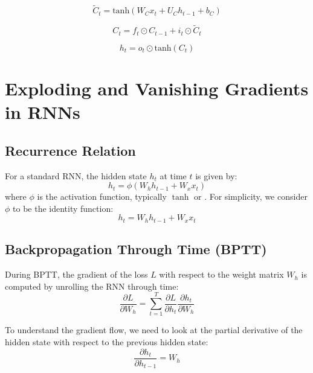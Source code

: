 \documentclass{article}
\begin{document}
\begin{equation}
\tilde{C}_t = \text{tanh}(W_C x_t + U_C h_{t-1} + b_C)
\end{equation}

\begin{equation}
C_t = f_t \odot C_{t-1} + i_t \odot \tilde{C}_t
\end{equation}

\begin{equation}
h_t = o_t \odot \text{tanh}(C_t)
\end{equation}

\section*{Exploding and Vanishing Gradients in RNNs}

\subsection*{Recurrence Relation}

For a standard RNN, the hidden state \( h_t \) at time \( t \) is given by:
\begin{equation}
h_t = \phi(W_h h_{t-1} + W_x x_t)
\end{equation}
where \( \phi \) is the activation function, typically \( \tanh \) or . For simplicity, we consider \( \phi \) to be the identity function:
\begin{equation}
h_t = W_h h_{t-1} + W_x x_t
\end{equation}

\subsection*{Backpropagation Through Time (BPTT)}

During BPTT, the gradient of the loss \( L \) with respect to the weight matrix \( W_h \) is computed by unrolling the RNN through time:
\begin{equation}
\frac{\partial L}{\partial W_h} = \sum_{t=1}^T \frac{\partial L}{\partial h_t} \frac{\partial h_t}{\partial W_h}
\end{equation}

To understand the gradient flow, we need to look at the partial derivative of the hidden state with respect to the previous hidden state:
\begin{equation}
\frac{\partial h_t}{\partial h_{t-1}} = W_h
\end{equation}
\end{document}
